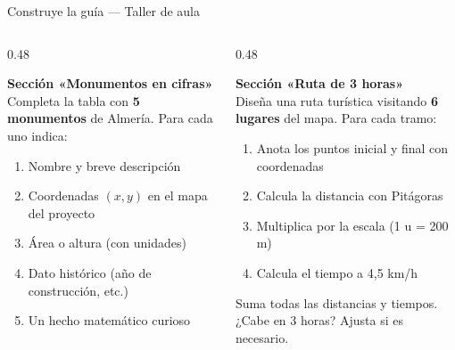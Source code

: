 \documentclass[aspectratio=169, 10pt, spanish]{beamer}
\begin{document}
\begin{frame}{Construye la guía — Taller de aula}
  \begin{columns}[T]
    \begin{column}{0.48\textwidth}
      \begin{aplicarbox}
        \AlmFontFootnote
        \textbf{Sección «Monumentos en cifras»}\\[4pt]
        Completa la tabla con \textbf{5 monumentos} de Almería.
        Para cada uno indica:
        \begin{enumerate}
          \item Nombre y breve descripción
          \item Coordenadas $(x,y)$ en el mapa del proyecto
          \item Área o altura (con unidades)
          \item Dato histórico (año de construcción, etc.)
          \item Un hecho matemático curioso
        \end{enumerate}
      \end{aplicarbox}
    \end{column}
    \begin{column}{0.48\textwidth}
      \begin{crearbox}
        \AlmFontFootnote
        \textbf{Sección «Ruta de 3 horas»}\\[4pt]
        Diseña una ruta turística visitando
        \textbf{6 lugares} del mapa. Para cada tramo:
        \begin{enumerate}
          \item Anota los puntos inicial y final con coordenadas
          \item Calcula la distancia con Pitágoras
          \item Multiplica por la escala (1 u = 200 m)
          \item Calcula el tiempo a 4{,}5 km/h
        \end{enumerate}
        Suma todas las distancias y tiempos.
        ¿Cabe en 3 horas? Ajusta si es necesario.
      \end{crearbox}
    \end{column}
  \end{columns}
\end{frame}
\end{document}
